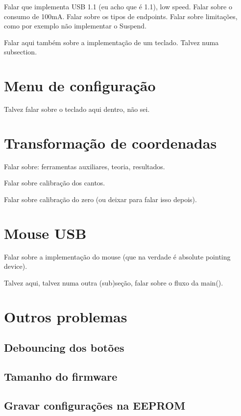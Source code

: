 \documentclass[brazil,pagestart=firstchapter]{abnt}
\begin{document}
Falar que implementa USB 1.1 (eu acho que é 1.1), low speed.
Falar sobre o consumo de 100mA.
Falar sobre os tipos de endpoints.
Falar sobre limitações, como por exemplo não
implementar o Suspend.

Falar aqui também sobre a implementação de um teclado. Talvez numa
subsection.

\section{Menu de configuração\label{sec:menu}}

Talvez falar sobre o teclado aqui dentro, não sei.

\section{Transformação de coordenadas\label{sec:coordenadas}}

Falar sobre: ferramentas auxiliares, teoria, resultados.

Falar sobre calibração dos cantos.

Falar sobre calibração do zero (ou deixar para falar isso depois).

\section{Mouse USB\label{sec:mouse}}

Falar sobre a implementação do mouse (que na verdade é absolute pointing
device).

Talvez aqui, talvez numa outra (sub)seção, falar sobre o fluxo da main().

\section{Outros problemas\label{sec:outros_problemas}}

\subsection{Debouncing dos botões\label{sec:debouncing}}

\subsection{Tamanho do firmware\label{sec:firmware_size}}

\subsection{Gravar configurações na EEPROM\label{sec:eeprom}}
\end{document}

